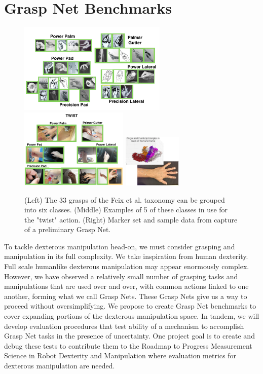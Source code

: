 \section{Grasp Net Benchmarks}   
    \label{secGraspNet}
 
\begin{figure}
\begin{center}
{\includegraphics[height=1.7in]{./figs/sixGraspTypes.png}}
{\includegraphics[height=1.5in]{./figs/twistGraspTypes.png}}
{\includegraphics[height=1in]{./figs/mocap.png}}
\end{center}
\caption[]{(Left) The 33 grasps of the Feix et al. taxonomy \cite{feixgrasp} can be grouped into six classes. (Middle) Examples of 5 of these classes in use for the "twist" action. (Right) Marker set and sample data from capture of a preliminary Grasp Net.}
\label{GraspNet}
\end{figure}

To tackle dexterous manipulation head-on, we must consider grasping and manipulation in its full complexity.   We take inspiration from human dexterity.   Full scale humanlike dexterous manipulation may appear enormously complex.   However,  we have observed a relatively small number of grasping tasks and manipulations that are used over and over, with common actions linked to one another, forming what we call Grasp Nets.   These Grasp Nets give us a way to proceed without oversimplifying.  We propose to create Grasp Net benchmarks to cover expanding portions of the dexterous manipulation space.   In tandem, we will develop evaluation procedures that test ability of a mechanism to accomplish Grasp Net tasks in the presence of uncertainty.   One project goal is to create and debug these tests to contribute them to the Roadmap to Progress Measurement Science in Robot Dexterity and Manipulation \cite{falco2014roadmap} where evaluation metrics for dexterous manipulation are needed.   

